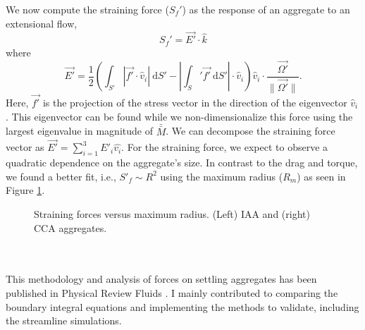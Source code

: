 \par
We now compute the straining force ($S_f'$) as the response of an aggregate to an extensional flow,
\begin{equation}
S_f' = \vec{E'} \cdot \hat{k}
\end{equation}
where
\begin{equation}
\vec{E'} = \frac{1}{2} \left( 
\int_{S'} \left|\vec{f'} \cdot \hat{v}_i \right| \ \text{d}S'-
\left| \int_S' \vec{f'} \ \text{d} S' \right|\cdot \hat{v}_i
 \right)  \hat{v}_i
 \cdot \frac{\vec{\Omega'}}{\|\vec{\Omega'}\|}.
\end{equation}
Here,  $\vec{f'}$ is the projection of the stress vector in the direction of the eigenvector $\hat{v}_i$.
This eigenvector can be found while we non-dimensionalize this force using the largest eigenvalue in magnitude of $\bar{ \bar{M} }$.
We can decompose the straining force vector as $\vec{E'} = \sum_{i=1}^3 E'_i \hat{v_i}$. 
For the straining force, we expect to observe a quadratic dependence on the aggregate's size. In contrast to the drag and torque, we found a better fit, i.e., $S'_f \sim R^2$ using the maximum radius ($R_m$) as seen in Figure \ref{fig_straining}. 
\begin{figure}[h]
\begin{center}
\end{center}
\caption{Straining forces versus maximum radius. (Left) IAA and (right) CCA aggregates.}
\label{fig_straining}
\end{figure}
\\
\\
This methodology and analysis of forces on settling aggregates has been published in Physical Review Fluids \cite{yoo_hydrodynamic_2020}.
I mainly contributed to comparing the boundary integral equations and implementing the methods to validate, including the streamline simulations. 
